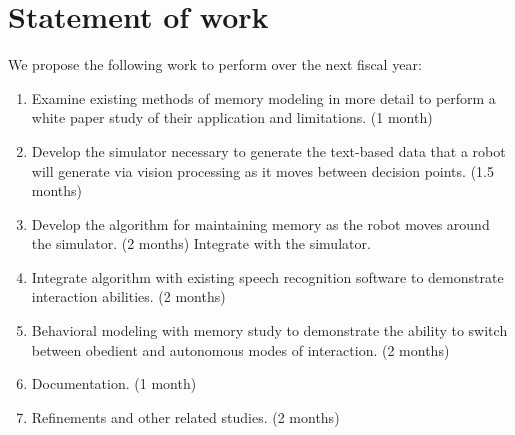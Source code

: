 \documentclass[12pt]{amsart}
\begin{document}
\section{Statement of work}
We propose the following work to perform over the next fiscal year:

\begin{enumerate}
\item
Examine existing methods of memory modeling in more detail to perform
a white paper study of their application and limitations.   (1 month)

\item
Develop the simulator necessary to generate the text-based data that
a robot will generate via vision processing as it moves between decision
points.  (1.5 months)

\item
Develop the algorithm for maintaining memory as the robot moves
around the simulator.   (2 months)
    Integrate with the simulator.

\item
Integrate algorithm with existing speech recognition software to
demonstrate interaction abilities.   (2 months)

\item
Behavioral modeling with memory study to demonstrate the ability to
switch between obedient and autonomous modes of
    interaction.  (2 months)

\item
Documentation.  (1 month)

\item
Refinements and other related studies.  (2 months)

\end{enumerate}




\end{document}
